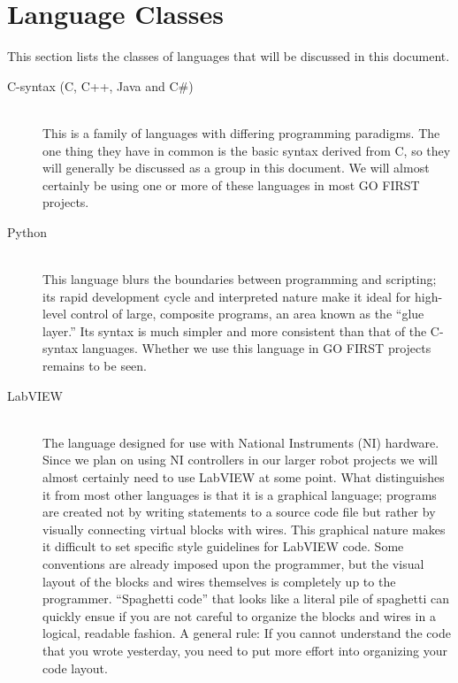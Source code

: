 \documentclass[12pt]{article}
\begin{document}
\section{Language Classes}
This section lists the classes of languages that will be discussed in this document.
\begin{description}
    \item[C-syntax (C, C++, Java and C\#)] \hfill \\
        This is a family of languages with differing programming paradigms. The one thing they have in common is the basic syntax derived from C, so they will generally be discussed as a group in this document. We will almost certainly be using one or more of these languages in most GO FIRST projects.
    \item[Python] \hfill \\
        This language blurs the boundaries between programming and scripting; its rapid development cycle and interpreted nature make it ideal for high-level control of large, composite programs, an area known as the ``glue layer.'' Its syntax is much simpler and more consistent than that of the C-syntax languages. Whether we use this language in GO FIRST projects remains to be seen.
    \item[LabVIEW] \hfill \\
        The language designed for use with National Instruments (NI) hardware. Since we plan on using NI controllers in our larger robot projects we will almost certainly need to use LabVIEW at some point. What distinguishes it from most other languages is that it is a graphical language; programs are created not by writing statements to a source code file but rather by visually connecting virtual blocks with wires. This graphical nature makes it difficult to set specific style guidelines for LabVIEW code. Some conventions are already imposed upon the programmer, but the visual layout of the blocks and wires themselves is completely up to the programmer. ``Spaghetti code'' that looks like a literal pile of spaghetti can quickly ensue if you are not careful to organize the blocks and wires in a logical, readable fashion. A general rule: If you cannot understand the code that you wrote yesterday, you need to put more effort into organizing your code layout.
\end{description}
\end{document}
